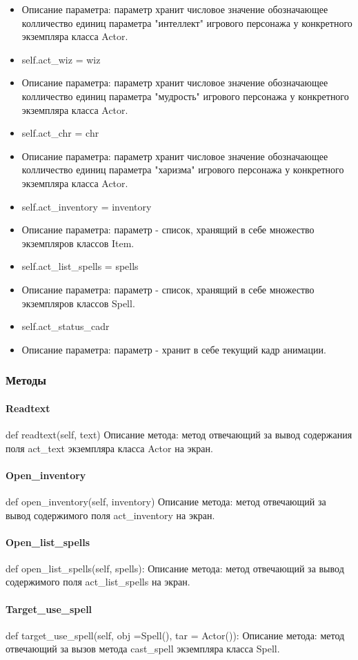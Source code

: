 \begin{itemize}
	\item Описание параметра: параметр хранит числовое значение обозначающее колличество единиц параметра "интеллект" игрового персонажа у конкретного экземпляра класса Actor.
	\item self.act\_wiz = wiz 
	\item Описание параметра: параметр хранит числовое значение обозначающее колличество единиц параметра "мудрость" игрового персонажа у конкретного экземпляра класса Actor.
	\item self.act\_chr = chr
	\item Описание параметра: параметр хранит числовое значение обозначающее колличество единиц параметра "харизма" игрового персонажа у конкретного экземпляра класса Actor.
	\item self.act\_inventory = inventory
	\item Описание параметра: параметр - список, хранящий в себе множество экземпляров классов Item.
	\item self.act\_list\_spells = spells
	\item Описание параметра: параметр - список, хранящий в себе множество экземпляров классов Spell.
	\item self.act\_status\_cadr
	\item Описание параметра: параметр - хранит в себе текущий кадр анимации.
\end{itemize}
\subsubsection{Методы}
\paragraph{Readtext}
def readtext(self, text)
Описание метода: метод отвечающий за вывод содержания поля act\_text экземпляра класса Actor на экран.
\paragraph{Open\_inventory}
def open\_inventory(self, inventory)
Описание метода:  метод отвечающий за вывод содержимого поля act\_inventory на экран.
\paragraph{Open\_list\_spells}
def open\_list\_spells(self, spells):
Описание метода: метод отвечающий за вывод содержимого поля act\_list\_spells на экран.
\paragraph{Target\_use\_spell}
def target\_use\_spell(self, obj =Spell(), tar = Actor()):
Описание метода: метод отвечающий за вызов метода cast\_spell экземпляра класса Spell.
